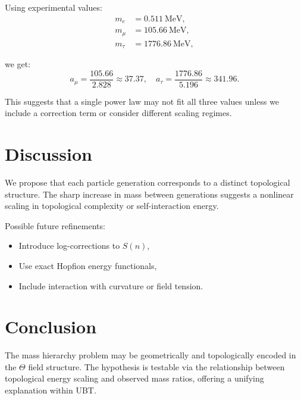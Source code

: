 \documentclass[12pt]{article}
\begin{document}
Using experimental values:
\begin{align*}
m_e &= 0.511~\text{MeV}, \\
m_\mu &= 105.66~\text{MeV}, \\
m_\tau &= 1776.86~\text{MeV},
\end{align*}

we get:
\[
a_\mu = \frac{105.66}{2.828} \approx 37.37,\quad
a_\tau = \frac{1776.86}{5.196} \approx 341.96.
\]

This suggests that a single power law may not fit all three values unless we include a correction term or consider different scaling regimes.

\section{Discussion}

We propose that each particle generation corresponds to a distinct topological structure. The sharp increase in mass between generations suggests a nonlinear scaling in topological complexity or self-interaction energy.

Possible future refinements:
\begin{itemize}
    \item Introduce log-corrections to $S(n)$,
    \item Use exact Hopfion energy functionals,
    \item Include interaction with curvature or field tension.
\end{itemize}

\section{Conclusion}

The mass hierarchy problem may be geometrically and topologically encoded in the $\Theta$ field structure. The hypothesis is testable via the relationship between topological energy scaling and observed mass ratios, offering a unifying explanation within UBT.
\end{document}
